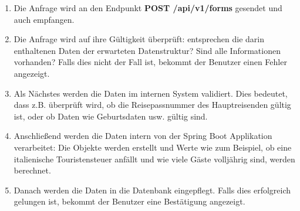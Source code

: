 		\begin{enumerate}
			\item Die Anfrage wird an den Endpunkt \textbf{POST /api/v1/forms} gesendet und auch empfangen.
			\item Die Anfrage wird auf ihre Gültigkeit überprüft: entsprechen die darin enthaltenen Daten der erwarteten Datenstruktur? Sind alle Informationen vorhanden? Falls dies nicht der Fall ist, bekommt der Benutzer einen Fehler angezeigt.
			\item Als Nächstes werden die Daten im internen System validiert. Dies bedeutet, dass z.B. überprüft wird, ob die Reisepassnummer des Hauptreisenden gültig ist, oder ob Daten wie Geburtsdaten usw. gültig sind.
			\item Anschließend werden die Daten intern von der Spring Boot Applikation verarbeitet: Die Objekte werden erstellt und Werte wie zum Beispiel, ob eine italienische Touristensteuer anfällt und wie viele Gäste volljährig sind, werden berechnet.
			\item Danach werden die Daten in die Datenbank eingepflegt. Falls dies erfolgreich gelungen ist, bekommt der Benutzer eine Bestätigung angezeigt.
		\end{enumerate}